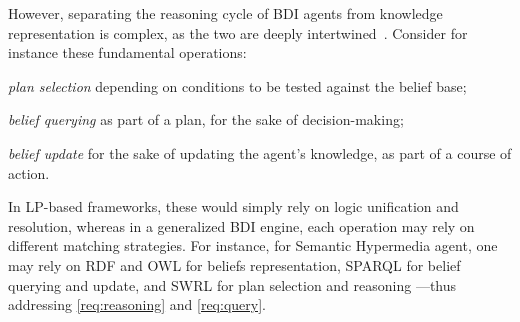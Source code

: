 \documentclass[
]{ceurart}
\begin{document}
However,
separating the reasoning cycle of \ac{BDI} agents from knowledge representation is complex,
as the two are deeply intertwined~\cite{DBLP:conf/dalt/MoreiraVBH05}.
%
Consider for instance these fundamental operations:
%
\begin{inlinelist}
  \item \emph{plan selection}
  depending on conditions to be tested against the belief base;

  \item \emph{belief querying}
  as part of a plan, for the sake of decision-making;

  \item \emph{belief update}
  for the sake of updating the agent's knowledge,
  as part of a course of action.
\end{inlinelist}
%
In \ac{LP}-based frameworks,
these would simply rely on logic unification and resolution,
whereas in a generalized \ac{BDI} engine,
each operation may rely on different matching strategies.
%
For instance,
for Semantic Hypermedia agent,
one may rely on \ac{RDF} and \ac{OWL} for beliefs representation,
\acs{SPARQL} for belief querying and update,
and \ac{SWRL} for plan selection and reasoning%
%
---thus addressing \ref{req:reasoning} and \ref{req:query}.
\end{document}

